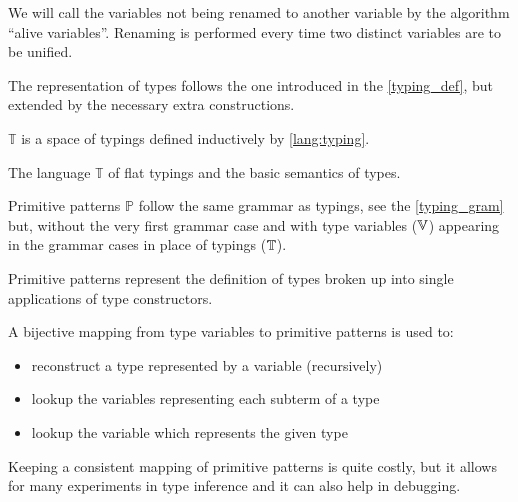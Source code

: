 \begin{defn}
    We will call the variables not being renamed to another variable by the algorithm ``alive variables''. Renaming is performed every time two distinct variables are to be unified.
\end{defn}

The representation of types follows the one introduced in the \cref{typing_def}, but extended by the necessary extra constructions.

\begin{defn}[Typings]
    \label{typing_gram}
    $\mathbb{T}$ is a space of typings defined inductively by \cref{lang:typing}.
\end{defn}

\begin{lang}
  \def\grammarP{0.6}
  \begin{grammar}
  \end{grammar}
  \caption{The language $\mathbb{T}$ of flat typings and the basic semantics of types.}
  \label{lang:typing}
\end{lang}

\begin{defn}
    Primitive patterns $\mathbb{P}$ follow the same grammar as typings, see the \cref{typing_gram} but, without the very first grammar case and with type variables ($\mathbb{V}$) appearing in the grammar cases in place of typings ($\mathbb{T}$).

    Primitive patterns represent the definition of types broken up into single applications of type constructors.
\end{defn}

\begin{remark}
    A bijective mapping from type variables to primitive patterns is used to:

    \begin{itemize}
        \item reconstruct a type represented by a variable (recursively)
        \item lookup the variables representing each subterm of a type
        \item lookup the variable which represents the given type 
    \end{itemize}

    Keeping a consistent mapping of primitive patterns is quite costly, but it allows for many experiments in type inference and it can also help in debugging.
\end{remark}

